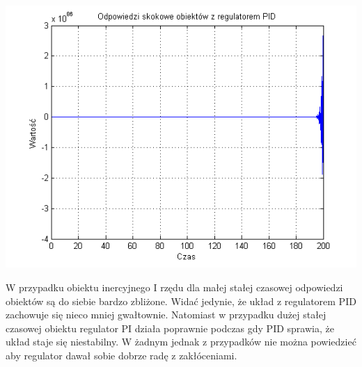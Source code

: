 \documentclass[10pt,a4paper]{article}
\begin{document}
\includegraphics[scale=1]{images/cztery/skrypt_02.png}\\ 
\newpage

W przypadku obiektu inercyjnego I rzędu dla małej stałej czasowej odpowiedzi obiektów są do siebie bardzo zbliżone. Widać jedynie, że układ z regulatorem PID zachowuje się nieco mniej gwałtownie. Natomiast w przypadku dużej stałej czasowej obiektu regulator PI działa poprawnie podczas gdy PID sprawia, że układ staje się niestabilny. W żadnym jednak z przypadków nie można powiedzieć aby regulator dawał sobie dobrze radę z zakłóceniami.
\newpage 
\end{document}
